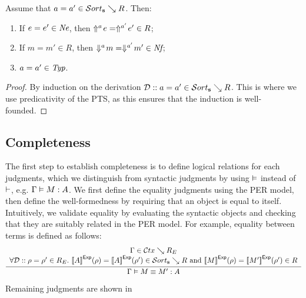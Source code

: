 \begin{theorem}
  \label{thm:realizability}
  Assume that $a = a' \in \persort \searrow R$.  Then:
  \begin{enumerate}
  \item If $e = e' \in {\normalfont\textit{Ne}}$, then $\Uparrow^{a}\!e = \Uparrow^{a'}\!e' \in R$;
  \item If $m = m' \in R$, then $\Downarrow^{a}\!m = \Downarrow^{a'}\!m' \in {\normalfont\textit{Nf}}$;
  \item $a = a' \in {\normalfont\textit{Typ}}$.
  \end{enumerate}
\end{theorem}
\begin{proof}
  By induction on the derivation $\DD :: a = a' \in \persort \searrow R$.
  This is where we use predicativity of the \ac{PTS}, as this ensures that the induction is well-founded.
\end{proof}



\subsection{Completeness}



The first step to establish completeness is to define logical relations for each judgments,
  which we distinguish from syntactic judgments by using $\vDash$ instead of $\vdash$, e.g. $\Gamma \vDash M : A$.
We first define the equality judgments using the PER model, then define the well-formedness by requiring that an object is equal to itself.
Intuitively, we validate equality by evaluating the syntactic objects and checking that they are suitably related in the PER model.
For example, equality between terms is defined as follows:
\[
\infer{
  \eqexpsem \Gamma M {M'} A
}{
  \begin{array}{c}
    \Gamma \in \perctx \searrow R_E
    \\
    \forall \DD :: \rho = \rho' \in R_E.\
    \evalexpfunc A \rho = \evalexpfunc A {\rho'} \in \persort \searrow R
    ~\text{and}~
    \evalexpfunc M \rho = \evalexpfunc {M'} {\rho'} \in R
  \end{array}
}
\]
Remaining judgments are shown in 


